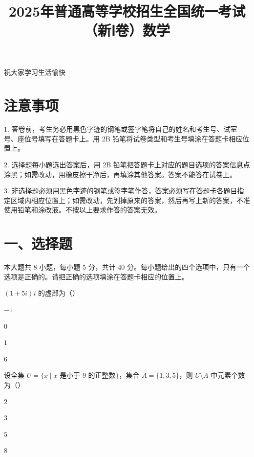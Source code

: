 \documentclass[zihao=-4]{exam-zh}
\title{2025年普通高等学校招生全国统一考试（新Ⅰ卷）数学}
\date{}
\begin{document}
\maketitle

\noindent 祝大家学习生活愉快

\section*{注意事项}

1. 答卷前，考生务必用黑色字迹的钢笔或签字笔将自己的姓名和考生号、试室号、座位号填写在答题卡上。用 2B 铅笔将试卷类型和考生号填涂在答题卡相应位置上。

2. 选择题每小题选出答案后，用 2B 铅笔把答题卡上对应的题目选项的答案信息点涂黑；如需改动，用橡皮擦干净后，再填涂其他答案。答案不能答在试卷上。

3. 非选择题必须用黑色字迹的钢笔或签字笔作答，答案必须写在答题卡各题目指定区域内相应位置上；如需改动，先划掉原来的答案，然后再写上新的答案，不准使用铅笔和涂改液。不按以上要求作答的答案无效。

\section*{一、选择题}

本大题共 8 小题，每小题 5 分，共计 40 分。每小题给出的四个选项中，只有一个选项是正确的。请把正确的选项填涂在答题卡相应的位置上。

\begin{question}[points=5]
$(1+5i)i$ 的虚部为（\quad）
\begin{choices}
  \item $-1$
  \item $0$
  \item $1$
  \item $6$
\end{choices}
\end{question}

\begin{question}[points=5]
设全集 $U=\{x\mid x\text{ 是小于 }9\text{ 的正整数}\}$，集合 $A=\{1,3,5\}$，则 $U\setminus A$ 中元素个数为（\quad）
\begin{choices}
  \item $2$
  \item $3$
  \item $5$
  \item $8$
\end{choices}
\end{question}
\end{document}
